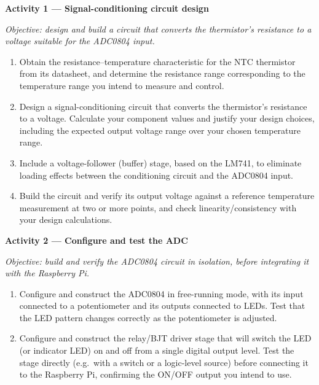 \begin{procedure}

  \textbf{Activity 1 --- Signal-conditioning circuit design}\vspace{2pt}

  \textit{Objective: design and build a circuit that converts the thermistor's resistance to a voltage suitable for the ADC0804 input.}

  \begin{enumerate}
    \item Obtain the resistance--temperature characteristic for the NTC thermistor from its datasheet, and determine the resistance range corresponding to the temperature range you intend to measure and control.
    \item Design a signal-conditioning circuit that converts the thermistor's resistance to a voltage. Calculate your component values and justify your design choices, including the expected output voltage range over your chosen temperature range.
    \item Include a voltage-follower (buffer) stage, based on the LM741, to eliminate loading effects between the conditioning circuit and the ADC0804 input.
    \item Build the circuit and verify its output voltage against a reference temperature measurement at two or more points, and check linearity/consistency with your design calculations.
  \end{enumerate}
  \vspace*{1.5em}

  \textbf{Activity 2 --- Configure and test the ADC}\vspace{2pt}

  \textit{Objective: build and verify the ADC0804 circuit in isolation, before integrating it with the Raspberry Pi.}

  \begin{enumerate}
    \item Configure and construct the ADC0804 in free-running mode, with its input connected to a potentiometer and its outputs connected to LEDs. Test that the LED pattern changes correctly as the potentiometer is adjusted.
    \item Configure and construct the relay/BJT driver stage that will switch the LED (or indicator LED) on and off from a single digital output level. Test the stage directly (e.g.\ with a switch or a logic-level source) before connecting it to the Raspberry Pi, confirming the ON/OFF output you intend to use.
  \end{enumerate}
  \newpage


\end{procedure}
